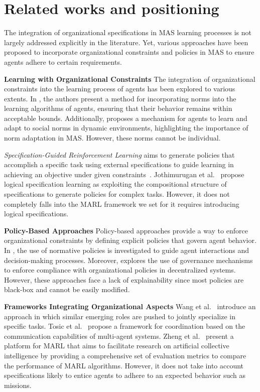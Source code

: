 \documentclass[runningheads]{llncs}
\theoremstyle{freethm}
\theoremstyle{proofoutline}
\begin{document}
\section{Related works and positioning}\label{sec:related_works}

The integration of organizational specifications in MAS learning processes is not largely addressed explicitly in the literature. Yet, various approaches have been proposed to incorporate organizational constraints and policies in MAS to ensure agents adhere to certain requirements.

\textbf{Learning with Organizational Constraints} \quad
%
The integration of organizational constraints into the learning process of agents has been explored to various extents. In \cite{cruz2020norms}, the authors present a method for incorporating norms into the learning algorithms of agents, ensuring that their behavior remains within acceptable bounds. Additionally, \cite{villatoro2011social} proposes a mechanism for agents to learn and adapt to social norms in dynamic environments, highlighting the importance of norm adaptation in MAS. However, these norms cannot be individual.

\emph{Specification-Guided Reinforcement Learning} aims to generate policies that accomplish a specific task using external specifications to guide learning in achieving an objective under given constraints~\cite{Bansal2022}. Jothimurugan et al.~\cite{Jothimurugan2021} propose logical specification learning as exploiting the compositional structure of specifications to generate policies for complex tasks. However, it does not completely falls into the MARL framework we set for it requires introducing logical specifications.

\textbf{Policy-Based Approaches} \quad
%
Policy-based approaches provide a way to enforce organizational constraints by defining explicit policies that govern agent behavior. In \cite{krupanski2015norm}, the use of normative policies is investigated to guide agent interactions and decision-making processes. Moreover, \cite{vos2020governing} explores the use of governance mechanisms to enforce compliance with organizational policies in decentralized systems. However, these approaches face a lack of explainability since most policies are black-box and cannot be easily modified.

\textbf{Frameworks Integrating Organizational Aspects} \quad
%
Wang et al.~\cite{Wang2020} introduce an approach in which similar emerging roles are pushed to jointly specialize in specific tasks. Tosic et al.~\cite{Tosic2010} propose a framework for coordination based on the communication capabilities of multi-agent systems. Zheng et al.~\cite{Zheng2018} present a platform for MARL that aims to facilitate research on artificial collective intelligence by providing a comprehensive set of evaluation metrics to compare the performance of MARL algorithms. However, it does not take into account specifications likely to entice agents to adhere to an expected behavior such as missions.
\end{document}
